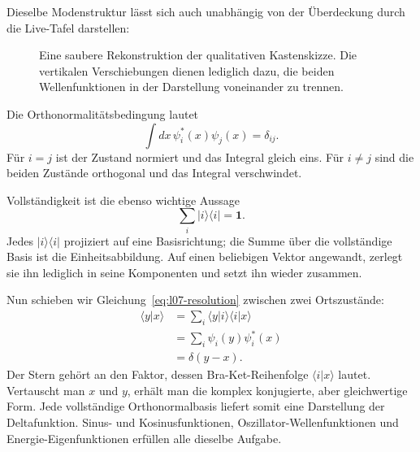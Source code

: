 Dieselbe Modenstruktur lässt sich auch unabhängig von der Überdeckung durch die Live-Tafel darstellen:
\begin{figure}[htbp]
\centering
{}
\caption{Eine saubere Rekonstruktion der qualitativen Kastenskizze. Die vertikalen Verschiebungen dienen lediglich dazu, die beiden Wellenfunktionen in der Darstellung voneinander zu trennen.}
\end{figure}

Die Orthonormalitätsbedingung lautet
\begin{equation}
\int dx\,\psi_i^*(x)\psi_j(x)=\delta_{ij}.
\label{eq:l07-orthonormality}
\end{equation}
Für \(i=j\) ist der Zustand normiert und das Integral gleich eins. Für \(i\ne j\) sind die beiden Zustände orthogonal und das Integral verschwindet.

Vollständigkeit ist die ebenso wichtige Aussage
\begin{equation}
\sum_i |i\rangle\langle i|=\mathbf 1.
\label{eq:l07-resolution}
\end{equation}
Jedes \(|i\rangle\langle i|\) projiziert auf eine Basisrichtung; die Summe über die vollständige Basis ist die Einheitsabbildung. Auf einen beliebigen Vektor angewandt, zerlegt sie ihn lediglich in seine Komponenten und setzt ihn wieder zusammen.

Nun schieben wir Gleichung~\eqref{eq:l07-resolution} zwischen zwei Ortszustände:
\begin{align}
\langle y|x\rangle
&=\sum_i\langle y|i\rangle\langle i|x\rangle \\
&=\sum_i\psi_i(y)\psi_i^*(x) \\
&=\delta(y-x).
\label{eq:l07-position-completeness}
\end{align}
Der Stern gehört an den Faktor, dessen Bra-Ket-Reihenfolge \(\langle i|x\rangle\) lautet. Vertauscht man \(x\) und \(y\), erhält man die komplex konjugierte, aber gleichwertige Form. Jede vollständige Orthonormalbasis liefert somit eine Darstellung der Deltafunktion. Sinus- und Kosinusfunktionen, Oszillator-Wellenfunktionen und Energie-Eigenfunktionen erfüllen alle dieselbe Aufgabe.

